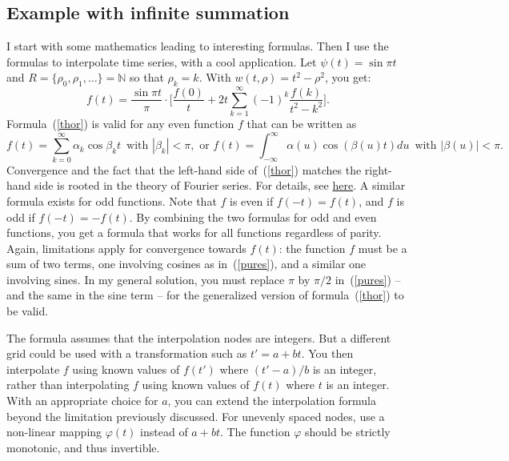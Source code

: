 \documentclass[oneside,10pt]{book}
\begin{document}

\subsection{Example with infinite summation} \label{puner}

I start with some mathematics leading to interesting formulas. Then I use the formulas to interpolate time series, with a cool
 application. Let $\psi(t)=\sin\pi t$ and $R = \{\rho_0, \rho_1, \dots\} = \mathbb{N}$ so that $\rho_k = k$. With
$w(t,\rho)=t^2 - \rho^2$, you get:
\begin{equation}
f(t) =\frac{\sin\pi t}{\pi} \cdot \Bigg[\frac{f(0)}{t} + 2t \sum_{k=1}^\infty (-1)^k \frac{f(k)}{t^2-k^2}\Bigg].\label{thor}
\end{equation}
Formula~(\ref{thor}) is valid for any even function $f$ that can be written as
\begin{equation}
f(t) = \sum_{k=0}^\infty \alpha_k \cos \beta_k t \, \text{ with } |\beta_k|<\pi, \text{ or }
f(t) = \int_{-\infty}^\infty \alpha(u)\cos(\beta(u)t )du \, \text{ with } |\beta(u)|<\pi. \label{pures}
\end{equation}
Convergence and the fact that the left-hand side of~(\ref{thor}) matches the right-hand side is rooted in the theory of Fourier series.
For details, see \href{https://mathoverflow.net/questions/438157/convergence-of-series-related-to-partial-fraction-expansion-of-cotangent-functio}{here}. A similar formula exists for odd functions. Note that $f$ is even if $f(-t)=f(t)$, and $f$ is odd
if $f(-t)=-f(t)$. By combining the two formulas for odd and even functions, you get a formula that works for all functions regardless of parity. Again, limitations apply for convergence towards $f(t)$: the function $f$ must be a sum of two terms, one involving cosines as in~(\ref{pures}), and a similar one involving sines. In my general solution, you must replace $\pi$ by $\pi/2$
 in~(\ref{pures}) -- and the same in the sine term -- for the generalized version of formula~(\ref{thor}) to be valid.

The formula assumes that the \textcolor{index}{interpolation nodes}
are integers. But a different grid could be used with a transformation such as $t'=a+bt$. You then
 interpolate $f$ using known values of $f(t')$ where $(t'-a)/b$ is an integer, rather than interpolating $f$ using known values of $f(t)$ where $t$ is an integer. With an appropriate choice for $a$,  you can extend the interpolation formula beyond the limitation previously discussed. For unevenly spaced nodes, use a non-linear mapping
 $\varphi(t)$ instead of $a+bt$. The function $\varphi$ should be strictly monotonic, and thus invertible.
\end{document}

